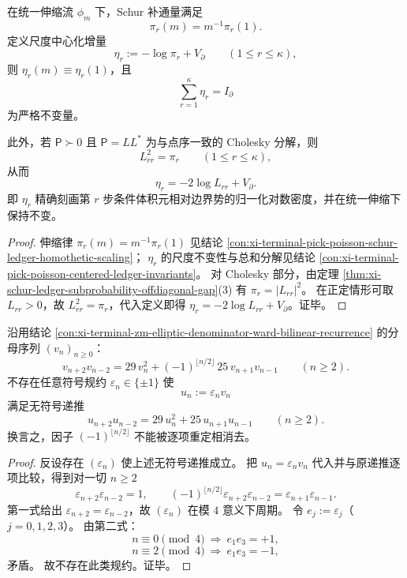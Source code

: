 \begin{proposition}\label{prop:xi-centered-ledger-cholesky-conditional-volume-density}
在统一伸缩流 \(\phi_m\) 下，Schur 补通量满足
\[
\pi_r(m)=m^{-1}\pi_r(1).
\]
定义尺度中心化增量
\[
\eta_r:=-\log\pi_r+V_\partial\qquad(1\le r\le\kappa),
\]
则 \(\eta_r(m)\equiv \eta_r(1)\)，且
\[
\sum_{r=1}^{\kappa}\eta_r=I_\partial
\]
为严格不变量。
\par
此外，若 \(\mathsf P\succ 0\) 且 \(\mathsf P=LL^\ast\) 为与点序一致的 Cholesky 分解，则
\[
L_{rr}^2=\pi_r\qquad(1\le r\le\kappa),
\]
从而
\[
\eta_r=-2\log L_{rr}+V_\partial.
\]
即 \(\eta_r\) 精确刻画第 \(r\) 步条件体积元相对边界势的归一化对数密度，并在统一伸缩下保持不变。
\end{proposition}
\begin{proof}
伸缩律 \(\pi_r(m)=m^{-1}\pi_r(1)\) 见结论 \ref{con:xi-terminal-pick-poisson-schur-ledger-homothetic-scaling}；
\(\eta_r\) 的尺度不变性与总和分解见结论 \ref{con:xi-terminal-pick-poisson-centered-ledger-invariants}。
对 Cholesky 部分，由定理 \ref{thm:xi-schur-ledger-subprobability-offdiagonal-gap}(3) 有 \(\pi_r=|L_{rr}|^2\)。
在正定情形可取 \(L_{rr}>0\)，故 \(L_{rr}^2=\pi_r\)，代入定义即得 \(\eta_r=-2\log L_{rr}+V_\partial\)。证毕。
\end{proof}

\begin{theorem}\label{thm:xi-ward-sign-factor-gauge-irreducible}
沿用结论 \ref{con:xi-terminal-zm-elliptic-denominator-ward-bilinear-recurrence} 的分母序列 \((v_n)_{n\ge 0}\)：
\[
v_{n+2}v_{n-2}=29\,v_n^2+(-1)^{\lfloor n/2\rfloor}\,25\,v_{n+1}v_{n-1}\qquad(n\ge 2).
\]
不存在任意符号规约 \(\varepsilon_n\in\{\pm1\}\) 使
\[
u_n:=\varepsilon_n v_n
\]
满足无符号递推
\[
u_{n+2}u_{n-2}=29\,u_n^2+25\,u_{n+1}u_{n-1}\qquad(n\ge 2).
\]
换言之，因子 \((-1)^{\lfloor n/2\rfloor}\) 不能被逐项重定相消去。
\end{theorem}
\begin{proof}
反设存在 \((\varepsilon_n)\) 使上述无符号递推成立。
把 \(u_n=\varepsilon_n v_n\) 代入并与原递推逐项比较，得到对一切 \(n\ge 2\)
\[
\varepsilon_{n+2}\varepsilon_{n-2}=1,
\qquad
(-1)^{\lfloor n/2\rfloor}\varepsilon_{n+2}\varepsilon_{n-2}
=\varepsilon_{n+1}\varepsilon_{n-1}.
\]
第一式给出 \(\varepsilon_{n+2}=\varepsilon_{n-2}\)，故 \((\varepsilon_n)\) 在模 \(4\) 意义下周期。
令 \(e_j:=\varepsilon_j\)（\(j=0,1,2,3\)）。
由第二式：
\[
n\equiv 0\pmod 4\ \Longrightarrow\ e_1e_3=+1,
\]
\[
n\equiv 2\pmod 4\ \Longrightarrow\ e_1e_3=-1,
\]
矛盾。
故不存在此类规约。证毕。
\end{proof}

